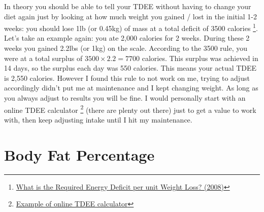 \documentclass[openany, 12pt]{book}
\begin{document}
	In theory you should be able to tell your TDEE without having
	to change your diet again just by looking at how much weight you gained / lost in the initial 1-2 weeks: you should lose 1lb (or 0.45kg) of mass at 
	a total deficit of 3500 calories
        \footnote{\href{https://www.ncbi.nlm.nih.gov/pmc/articles/PMC2376744/}{What is the Required Energy Deficit per 
	unit Weight Loss? (2008)}}. Let's take an example again: you ate 2,000 calories for 2 weeks. During these 2 weeks you gained 2.2lbs (or 1kg) on the
	scale. According to the 3500 rule, you were at a total surplus of $3500 \times 2.2 = 7700$ calories. This surplus was achieved in 14 days, so the
	surplus each day was 550 calories. This means your actual TDEE is 2,550 calories. However I found this rule to not work on me, trying to adjust 
	accordingly didn't put me at maintenance and I kept changing weight. As long as you always adjust to results you will be fine. I would personally
	start with an online TDEE calculator
        \footnote{\href{https://tdeecalculator.net/}{Example of online TDEE calculator}} (there are plenty out there) 
	just to get a value to work with, then keep adjusting intake until I hit my maintenance.
	
	\section{Body Fat Percentage}
	
\end{document}
